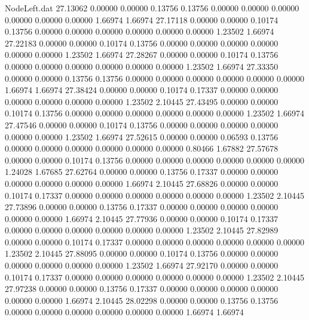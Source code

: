 \begin{filecontents}{NodeLeft.dat}
  27.13062    0.00000    0.00000     0.13756    0.13756    0.00000    0.00000    0.00000    0.00000    0.00000    0.00000    1.66974    1.66974
  27.17118    0.00000    0.00000     0.10174    0.13756    0.00000    0.00000    0.00000    0.00000    0.00000    0.00000    1.23502    1.66974
  27.22183    0.00000    0.00000     0.10174    0.13756    0.00000    0.00000    0.00000    0.00000    0.00000    0.00000    1.23502    1.66974
  27.28267    0.00000    0.00000     0.10174    0.13756    0.00000    0.00000    0.00000    0.00000    0.00000    0.00000    1.23502    1.66974
  27.33350    0.00000    0.00000     0.13756    0.13756    0.00000    0.00000    0.00000    0.00000    0.00000    0.00000    1.66974    1.66974
  27.38424    0.00000    0.00000     0.10174    0.17337    0.00000    0.00000    0.00000    0.00000    0.00000    0.00000    1.23502    2.10445
  27.43495    0.00000    0.00000     0.10174    0.13756    0.00000    0.00000    0.00000    0.00000    0.00000    0.00000    1.23502    1.66974
  27.47546    0.00000    0.00000     0.10174    0.13756    0.00000    0.00000    0.00000    0.00000    0.00000    0.00000    1.23502    1.66974
  27.52615    0.00000    0.00000     0.06593    0.13756    0.00000    0.00000    0.00000    0.00000    0.00000    0.00000    0.80466    1.67882
  27.57678    0.00000    0.00000     0.10174    0.13756    0.00000    0.00000    0.00000    0.00000    0.00000    0.00000    1.24028    1.67685
  27.62764    0.00000    0.00000     0.13756    0.17337    0.00000    0.00000    0.00000    0.00000    0.00000    0.00000    1.66974    2.10445
  27.68826    0.00000    0.00000     0.10174    0.17337    0.00000    0.00000    0.00000    0.00000    0.00000    0.00000    1.23502    2.10445
  27.73896    0.00000    0.00000     0.13756    0.17337    0.00000    0.00000    0.00000    0.00000    0.00000    0.00000    1.66974    2.10445
  27.77936    0.00000    0.00000     0.10174    0.17337    0.00000    0.00000    0.00000    0.00000    0.00000    0.00000    1.23502    2.10445
  27.82989    0.00000    0.00000     0.10174    0.17337    0.00000    0.00000    0.00000    0.00000    0.00000    0.00000    1.23502    2.10445
  27.88095    0.00000    0.00000     0.10174    0.13756    0.00000    0.00000    0.00000    0.00000    0.00000    0.00000    1.23502    1.66974
  27.92170    0.00000    0.00000     0.10174    0.17337    0.00000    0.00000    0.00000    0.00000    0.00000    0.00000    1.23502    2.10445
  27.97238    0.00000    0.00000     0.13756    0.17337    0.00000    0.00000    0.00000    0.00000    0.00000    0.00000    1.66974    2.10445
  28.02298    0.00000    0.00000     0.13756    0.13756    0.00000    0.00000    0.00000    0.00000    0.00000    0.00000    1.66974    1.66974

\end{filecontents}
